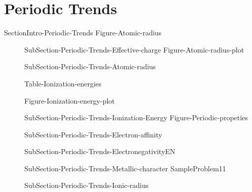 \documentclass[main.tex]{subfiles}
\newcommand\chapterlabel{Ch-Table}\setcounter{figurenewcounter}{0}\setcounter{tablenewcounter}{0}\setcounter{formulanewcounter}{0}\chapterpicture{../{\chapterlabel}/figure1}\chapterpicturelabel{PxFuel}
\begin{document}
{\newpage
\section{Periodic Trends}{SectionIntro-Periodic-Trends}
{Figure-Atomic-radius}
\sloppy\begin{description}
\item[] {SubSection-Periodic-Trends-Effective-charge}
{Figure-Atomic-radius-plot}
\item[] {SubSection-Periodic-Trends-Atomic-radius}
 
\checkoddpage\ifoddpage \hspace{-5cm} \else  \fi

{Table-Ionization-energies}

{Figure-Ionization-energy-plot}
\item[] {SubSection-Periodic-Trends-Ionization-Energy}
{Figure-Periodic-propeties}
\item[] {SubSection-Periodic-Trends-Electron-affinity}
\item[] {SubSection-Periodic-Trends-ElectronegativityEN}
\item[]{SubSection-Periodic-Trends-Metallic-character}
{SampleProblem11}
\item[]  {SubSection-Periodic-Trends-Ionic-radius}
\end{description}



\renewcommand\chapterlabel{Ch-Table}
}{}






 \checkoddpage\ifoddpage \clearpage\thispagestyle{empty}\mbox{}\clearpage \else  \fi 
\end{document}
